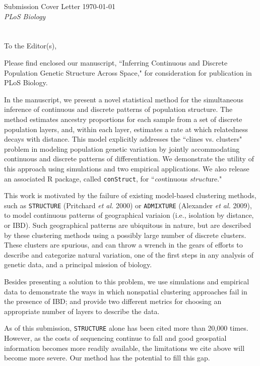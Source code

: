 \documentclass[11pt]{letter}
\begin{document}

Submission Cover Letter \hfill	\today\\
\emph{PLoS Biology}
\\\\\\
To the Editor(s),

Please find enclosed our manuscript,  
``Inferring Continuous and Discrete Population Genetic Structure Across Space,"
for consideration for publication in PLoS Biology.

In the manuscript, we present a novel statistical method 
for the simultaneous inference of continuous and discrete patterns of population structure.
The method estimates ancestry proportions for each 
sample from a set of discrete population layers, 
and, within each layer, estimates a rate at which relatedness decays with distance.
This model explicitly addresses the ``clines vs. clusters" problem in 
modeling population genetic variation by jointly accommodating 
continuous and discrete patterns of differentiation. 
We demonstrate the utility of this approach using simulations 
and two empirical applications. %
We also release an associated R package, called \texttt{conStruct}, 
for ``\emph{con}tinuous \emph{struct}ure."

This work is motivated by the failure of existing model-based clustering methods, 
such as \texttt{STRUCTURE} (Pritchard \emph{et al.} 2000)
or \texttt{ADMIXTURE} (Alexander \emph{et al.} 2009), 
to model continuous patterns of geographical variaion (i.e., isolation by distance, or IBD).
Such geographical patterns are ubiquitous in nature,
but are described by these clustering methods using a possibly large number of discrete clusters.
These clusters are spurious, and can throw a 
wrench in the gears of efforts to describe and categorize natural variation, 
one of the first steps in any analysis of genetic data, 
and a principal mission of biology.  

Besides presenting a solution to this problem,
we use simulations and empirical data to demonstrate 
the ways in which nonspatial clustering approaches 
fail in the presence of IBD; 
and provide two different metrics for choosing an appropriate 
number of layers to describe the data.

As of this submission, \texttt{STRUCTURE} alone has been cited more than 20,000 times.
However, as the costs of sequencing continue to fall
and good geospatial information becomes more readily available,
the limitations we cite above will become more severe.
Our method has the potential to fill this gap.
\end{document}

